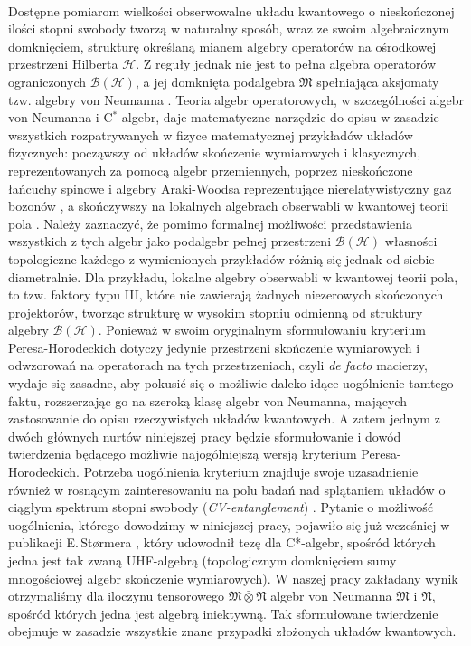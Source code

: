 \paragraph{}
\label{par:intro:02}
Dostępne pomiarom wielkości obserwowalne układu kwantowego o nieskończonej
ilości stopni swobody tworzą w naturalny sposób,
wraz ze swoim algebraicznym domknięciem,
strukturę określaną mianem algebry operatorów na ośrodkowej przestrzeni Hilberta
$\mathcal{H}$.
Z reguły jednak nie jest to pełna algebra operatorów ograniczonych
$\mathcal{B}(\mathcal{H})$,
a jej domknięta podalgebra $\mathfrak{M}$ spełniająca aksjomaty tzw.
algebry von Neumanna
\cite{Takesaki1}.
Teoria algebr operatorowych,
w szczególności algebr von Neumanna i \mbox{C$^{*}$-algebr},
daje matematyczne narzędzie do opisu w zasadzie wszystkich rozpatrywanych
w fizyce matematycznej przykładów układów fizycznych:
począwszy od układów skończenie wymiarowych i klasycznych,
reprezentowanych za pomocą algebr przemiennych,
poprzez nieskończone łańcuchy spinowe i algebry Araki-Woodsa reprezentujące
nierelatywistyczny gaz bozonów
\cite{araki1968classification},
a skończywszy na lokalnych algebrach obserwabli w kwantowej teorii pola
\cite{Nielsen2010}.
Należy zaznaczyć,
że pomimo formalnej możliwości przedstawienia wszystkich z tych algebr jako
podalgebr pełnej przestrzeni $\mathcal{B}(\mathcal{H})$
własności topologiczne każdego z wymienionych przykładów
różnią się jednak od siebie diametralnie.
Dla przykładu, lokalne algebry obserwabli w kwantowej teorii pola,
to tzw. faktory typu III,
które nie zawierają żadnych niezerowych skończonych projektorów,
tworząc strukturę w wysokim stopniu odmienną od struktury algebry $\mathcal{B}(\mathcal{H})$.
Ponieważ w swoim oryginalnym sformułowaniu kryterium Peresa-Horodeckich
dotyczy jedynie przestrzeni skończenie wymiarowych i odwzorowań na operatorach
na tych przestrzeniach,
czyli \emph{de facto} macierzy,
wydaje się zasadne,
aby pokusić się o możliwie daleko idące uogólnienie tamtego faktu,
rozszerzając go na szeroką klasę algebr von Neumanna,
mających zastosowanie do opisu rzeczywistych układów kwantowych.
A zatem jednym z dwóch głównych nurtów niniejszej pracy będzie sformułowanie
i dowód twierdzenia będącego możliwie najogólniejszą wersją
kryterium Peresa-Horodeckich.
Potrzeba uogólnienia kryterium znajduje swoje uzasadnienie również
w rosnącym zainteresowaniu na polu badań nad splątaniem układów o ciągłym
spektrum stopni swobody (\emph{CV-entanglement})
\cite{adesso2007entanglement}.
Pytanie o możliwość uogólnienia, którego dowodzimy w niniejszej pracy,
pojawiło się już wcześniej w publikacji E.\,St{\o}rmera
\cite{stormer2008separable},
który udowodnił tezę dla C*-algebr,
spośród których jedna jest tak zwaną UHF-algebrą
(topologicznym domknięciem sumy mnogościowej algebr skończenie wymiarowych).
W naszej pracy zakładany wynik otrzymaliśmy dla iloczynu tensorowego
$\mathfrak{M} \bar{\otimes} \mathfrak{N}$
algebr von Neumanna $\mathfrak{M}$ i $\mathfrak{N}$,
spośród których jedna jest algebrą iniektywną.
Tak sformułowane twierdzenie obejmuje w zasadzie wszystkie znane
przypadki złożonych układów kwantowych.

